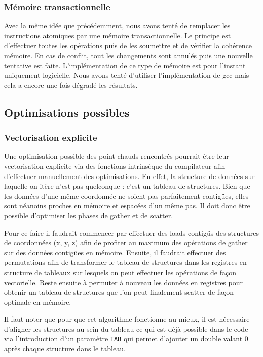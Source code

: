 \documentclass[11pt,a4paper]{article}
\begin{document}
			\subsubsection{Mémoire transactionnelle}
				Avec la même idée que précédemment, nous avons tenté de remplacer les instructions atomiques par une mémoire transactionnelle. Le principe est d'effectuer toutes les opérations puis de les soumettre et de vérifier la cohérence mémoire. En cas de conflit, tout les changements sont annulés puis une nouvelle tentative est faite. L'implémentation de ce type de mémoire est pour l'instant uniquement logicielle. Nous avons tenté d'utiliser l'implémentation de gcc mais cela a encore une fois dégradé les résultats.

		\subsection{Optimisations possibles}
			\subsubsection{Vectorisation explicite}
				Une optimisation possible des point chauds rencontrés pourrait être leur vectorisation explicite via des fonctions intrinsèque du compilateur afin d'effectuer manuellement des optimisations. En effet, la structure de données sur laquelle on itère n'est pas quelconque : c'est un tableau de structures. Bien que les données d'une même coordonnée ne soient pas parfaitement contigües, elles sont néanoins proches en mémoire et espacées d'un même pas. Il doit donc être possible d'optimiser les phases de gather et de scatter.

				Pour ce faire il faudrait commencer par effectuer des loads contigüs des structures de coordonnées (x, y, z) afin de profiter au maximum des opérations de gather sur des données contigües en mémoire. Ensuite, il faudrait effectuer des permutations afin de transformer le tableau de structures dans les registres en structure de tableaux sur lesquels on peut effectuer les opérations de façon vectorielle. Reste ensuite à permuter à nouveau les données en registres pour obtenir un tableau de structures que l'on peut finalement scatter de façon optimale en mémoire.

				Il faut noter que pour que cet algorithme fonctionne au mieux, il est nécessaire d'aligner les structures au sein du tableau ce qui est déjà possible dans le code via l'introduction d'un paramètre \texttt{TAB} qui permet d'ajouter un double valant 0 après chaque structure dans le tableau.
\end{document}
